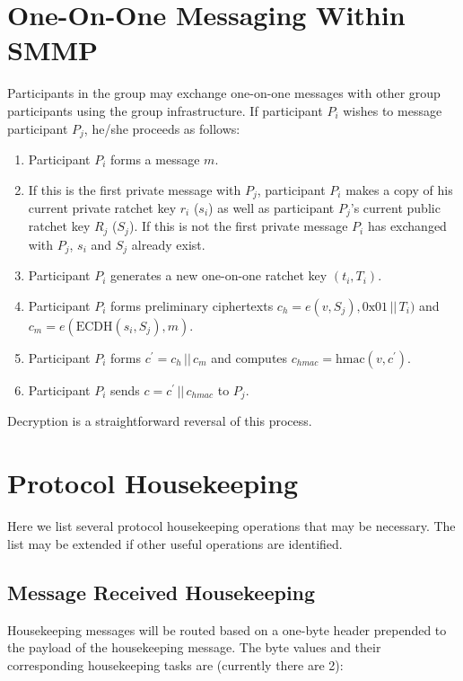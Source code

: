 \documentclass[%
preprint,
amsmath,amssymb,
aps,
prb,
floatfix,
]{revtex4-1}
\begin{document}
\section{\label{sec:im}One-On-One Messaging Within SMMP}
Participants in the group may exchange one-on-one messages with other group
participants using the group infrastructure. If participant $P_i$ wishes to
message participant $P_j$, he/she proceeds as follows:
\begin{enumerate}
\item Participant $P_i$ forms a message $m$.
\item If this is the first private message with $P_j$, participant $P_i$ makes
a copy of his current private ratchet key $r_i$
($s_i$) as well as participant $P_j$'s current public ratchet key $R_j$ ($S_j$).
If this is not the first private message $P_i$ has exchanged with $P_j$,
$s_i$ and $S_j$ already exist.
\item Participant $P_i$ generates a new one-on-one ratchet key $(t_i, T_i)$.
\item Participant $P_i$ forms preliminary ciphertexts $c_h = e(v, S_j), 0\mathrm{x}01
\, || \, T_i)$ and $c_m = e(\mathrm{ECDH}(s_i, S_j), m)$.
\item Participant $P_i$ forms $c^\prime = c_h \, || \, c_m$ and computes $c_{hmac} =
\mathrm{hmac}(v, c^\prime)$.
\item Participant $P_i$ sends $c = c^\prime \, || \, c_{hmac}$ to $P_j$.
\end{enumerate}
Decryption is a straightforward reversal of this process.

\section{\label{sec:housekeeping}Protocol Housekeeping}
Here we list several protocol housekeeping operations that may be necessary.
The list may be extended if other useful operations are identified.

\subsection{\label{sec:receivehousekeeping}Message Received Housekeeping}
Housekeeping messages will be routed based on a one-byte header prepended to the
payload of the housekeeping message. The byte values and their corresponding
housekeeping tasks are (currently there are 2): \\
\end{document}
